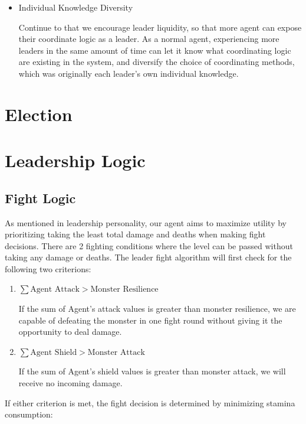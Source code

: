 \begin{itemize}
\begin{flushleft}
            \end{flushleft}
    \item Individual Knowledge Diversity
            \begin{flushleft}
            \setlength{\parindent}{2em}
            Continue to that we encourage leader liquidity, so that more agent can expose their coordinate logic as a leader. As a normal agent, experiencing more leaders in the same amount of time can let it know what coordinating logic are existing in the system, and diversify the choice of coordinating methods, which was originally each leader's own individual knowledge.
            \end{flushleft}
\end{itemize}


\section{Election}

\section{Leadership Logic}
\subsection{Fight Logic}
As mentioned in leadership personality, our agent aims to maximize utility by prioritizing taking the least total damage and deaths when making fight decisions. There are 2 fighting conditions where the level can be passed without taking any damage or deaths. The leader fight algorithm will first check for the following two criterions:

\begin{enumerate}
    \item
          $\sum{\text{Agent Attack}} > \text{Monster Resilience}$

          If the sum of Agent's attack values is greater than monster resilience, we are capable of defeating the monster in one fight round without giving it the opportunity to deal damage.

    \item
          $\sum{\text{Agent Shield}} > \text{Monster Attack}$

          If the sum of Agent's shield values is greater than monster attack, we will receive no incoming damage.
\end{enumerate}

If either criterion is met, the fight decision is determined by minimizing stamina consumption:

